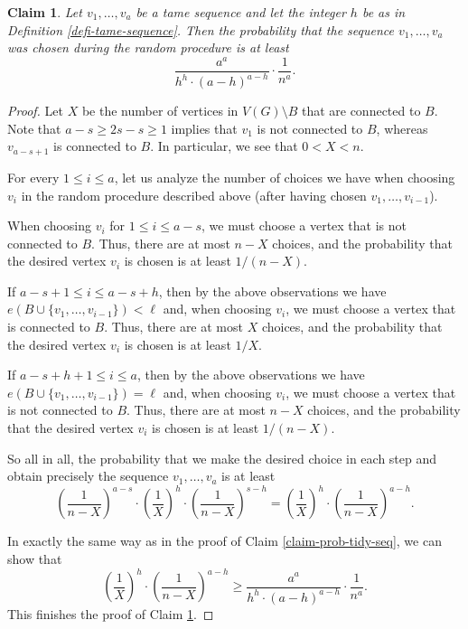 \documentclass[11pt]{article}
\newtheorem{claim}[theorem]{Claim}
\theoremstyle{definition}
\numberwithin{equation}{section}
\begin{document}
\begin{claim}\label{claim-prob-nice-seq} Let $v_1,\dots,v_a$ be a tame sequence and let the integer $h$ be as in Definition \ref{defi-tame-sequence}. Then the probability that the sequence $v_1,\dots,v_a$ was chosen during the random procedure is at least
\[\frac{a^a}{h^h\cdot (a-h)^{a-h}}\cdot \frac{1}{n^a}.\]
\end{claim}
\begin{proof}
Let $X$ be the number of vertices in $V(G)\setminus B$ that are connected to $B$. Note that $a-s\geq 2s-s\geq 1$ implies that $v_1$ is not connected to $B$, whereas  $v_{a-s+1}$ is connected to $B$. In particular, we see that $0<X<n$.

For every $1\leq i\leq a$, let us analyze the number of choices we have when choosing $v_i$ in the random procedure described above (after having chosen $v_1,\dots,v_{i-1}$).

When choosing $v_i$ for $1\leq i\leq a-s$, we must choose a vertex that is not connected to $B$. Thus, there are at most $n-X$ choices, and the probability that the desired vertex $v_i$ is chosen is at least $1/(n-X)$.

If $a-s+1\leq i\leq a-s+h$, then by the above observations we have $e(B\cup \lbrace v_1,\dots,v_{i-1}\rbrace)<\ell$ and, when choosing $v_i$, we must choose a vertex that is connected to $B$. Thus, there are at most $X$ choices, and the probability that the desired vertex $v_i$ is chosen is at least $1/X$.

If $a-s+ h+1\leq i\leq a$, then by the above observations we have $e(B\cup \lbrace v_1,\dots,v_{i-1}\rbrace)=\ell$ and, when choosing $v_i$, we must choose a vertex that is not connected to $B$. Thus, there are at most $n-X$ choices, and the probability that the desired vertex $v_i$ is chosen is at least $1/(n-X)$.

So all in all, the probability that we make the desired choice in each step and obtain precisely the sequence $v_1,\dots,v_a$ is at least
\[\left(\frac{1}{n-X}\right)^{a-s}\cdot \left(\frac{1}{X}\right)^h\cdot \left(\frac{1}{n-X}\right)^{s-h}=\left(\frac{1}{X}\right)^h\cdot \left(\frac{1}{n-X}\right)^{a-h}.\]

In exactly the same way as in the proof of Claim \ref{claim-prob-tidy-seq}, we can show that
\[\left(\frac{1}{X}\right)^h\cdot \left(\frac{1}{n-X}\right)^{a-h}\geq \frac{a^a}{h^h\cdot (a-h)^{a-h}}\cdot \frac{1}{n^a}.\]
This finishes the proof of Claim \ref{claim-prob-nice-seq}.
\end{proof}
\end{document}
